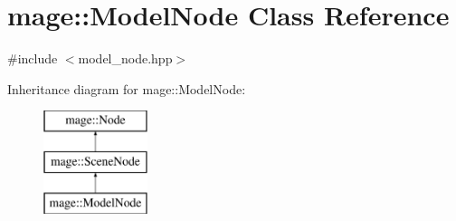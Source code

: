 \hypertarget{classmage_1_1_model_node}{}\section{mage\+:\+:Model\+Node Class Reference}
\label{classmage_1_1_model_node}


{\ttfamily \#include $<$model\+\_\+node.\+hpp$>$}

Inheritance diagram for mage\+:\+:Model\+Node\+:\begin{figure}[H]
\begin{center}
\leavevmode
\includegraphics[height=3.000000cm]{classmage_1_1_model_node}
\end{center}
\end{figure}

